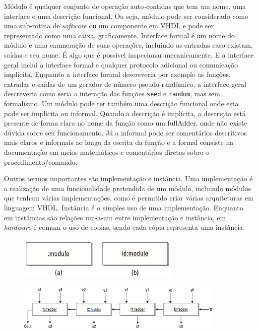 Módulo é qualquer conjunto de operação auto-contidas que tem um nome, uma interface e uma descrição funcional. Ou seja, módulo pode ser considerado como uma sub-rotina de \textit{software} ou um componente em VHDL e pode ser representado como uma caixa, graficamente. Interface formal é um nome do módulo e uma enumeração de suas operações, incluindo as entradas caso existam, saídas e seu nome. É algo que é possível inspecionar mecanicamente. E a interface geral inclui a interface formal e qualquer protocolo adicional ou comunicação implícita. Enquanto a interface formal descreveria por exemplo as funções, entradas e saídas de um gerador de número pseudo-randômico, a interface geral descreveria como seria a interação das funções \texttt{seed} e \texttt{random}, mas sem formalismo. Um módulo pode ter também uma descrição funcional onde esta pode ser implícita ou informal. Quando a descrição é implícita, a descrição está presente de forma clara no nome da função como um fullAdder, onde não existe dúvida sobre seu funcionamento. Já a informal pode ser comentários descritivos mais claros e informais ao longo da escrita da função e a formal consiste na documentação em meios matemáticos e comentários diretos sobre o procedimento/comando.

Outros termos importantes são implementação e instância. Uma implementação é a realização de uma funcionalidade pretendida de um módulo, incluindo módulos que tenham várias implementações, como é permitido criar várias arquiteturas em linguagem VHDL. Instância é o simples uso de uma implementação. Enquanto em instâncias são relações um-a-um entre implementação e instância, em \textit{hardware} é comum o uso de copias, sendo cada cópia representa uma instância.


\begin{figure}[h] \centering
	\includegraphics[width=0.7\textwidth]{img/f3-2.png}
	\caption{}
	\label{fig:f3-2}
\end{figure}

\begin{figure}[h] \centering
	\includegraphics[width=0.9\textwidth]{img/f3-3.png}
	\caption{}
	\label{fig:f3-3}
\end{figure}

